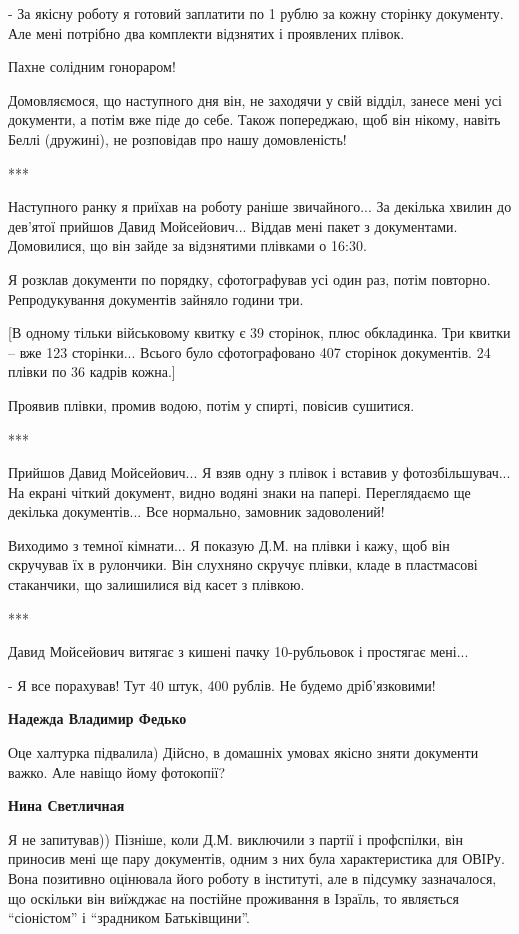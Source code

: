 \begin{itemize}
\begin{itemize}
\begin{itemize}
- За якісну роботу я готовий заплатити по 1 рублю за кожну сторінку документу.
Але мені потрібно два комплекти відзнятих і проявлених плівок.

Пахне солідним гонораром!

Домовляємося, що наступного дня він, не заходячи у свій відділ, занесе мені усі
документи, а потім вже піде до себе. Також попереджаю, щоб він нікому, навіть
Беллі (дружині), не розповідав про нашу домовленість!

***

Наступного ранку я приїхав на роботу раніше звичайного... За декілька хвилин до
дев’ятої прийшов Давид Мойсейович... Віддав мені пакет з документами. Домовилися,
що він зайде за відзнятими плівками о 16:30.

Я розклав документи по порядку, сфотографував усі один раз, потім повторно.
Репродукування документів зайняло години три.

[В одному тільки військовому квитку є 39 сторінок, плюс обкладинка. Три квитки
– вже 123 сторінки... Всього було сфотографовано 407 сторінок документів. 24
плівки по 36 кадрів кожна.]

Проявив плівки, промив водою, потім у спирті, повісив сушитися.

***

Прийшов Давид Мойсейович... Я взяв одну з плівок і вставив у фотозбільшувач... На
екрані чіткий документ, видно водяні знаки на папері. Переглядаємо ще декілька
документів... Все нормально, замовник задоволений!

Виходимо з темної кімнати... Я показую Д.М. на плівки і кажу, щоб він скручував
їх в рулончики. Він слухняно скручує плівки, кладе в пластмасові стаканчики, що
залишилися від касет з плівкою.

***

Давид Мойсейович витягає з кишені пачку 10-рубльовок і простягає мені...

- Я все порахував! Тут 40 штук, 400 рублів. Не будемо дріб’язковими!


\textbf{Надежда Владимир Федько} 

Оце халтурка підвалила) Дійсно, в домашніх умовах якісно зняти документи важко.
Але навіщо йому фотокопії?

\textbf{Нина Светличная} 

Я не запитував)) Пізніше, коли Д.М. виключили з партії і профспілки, він
приносив мені ще пару документів, одним з них була характеристика для ОВІРу.
Вона позитивно оцінювала його роботу в інституті, але в підсумку зазначалося,
що оскільки він виїжджає на постійне проживання в Ізраїль, то являється
\enquote{сіоністом} і \enquote{зрадником Батьківщини}.



\end{itemize}
\end{itemize}
\end{itemize}
